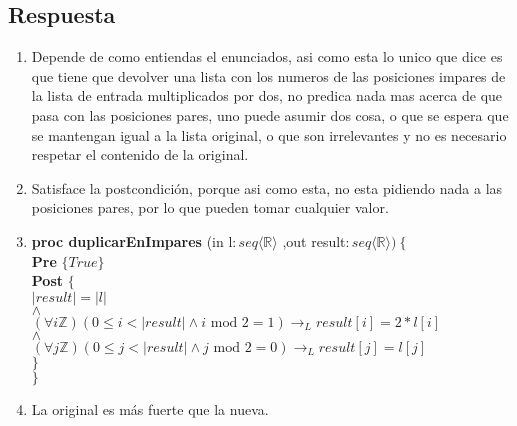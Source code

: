\documentclass[a4paper]{article}
\begin{document}
\subsection*{Respuesta}
	\begin{enumerate}[label=\alph*)]
		\item Depende de como entiendas el enunciados, asi como esta lo unico que dice es
			que tiene que devolver una lista con los numeros de las posiciones impares de la lista
			de entrada multiplicados por dos, no predica nada mas acerca de que pasa con las 
			posiciones pares, uno puede asumir dos cosa, o que se espera que se mantengan 
			igual a la lista original, o que son irrelevantes y no es necesario respetar
			el contenido de la original.
		\item
			Satisface la postcondición, porque asi como esta, no esta pidiendo nada a las
			posiciones pares, por lo que pueden tomar cualquier valor.
		\item
		
			\textbf{proc duplicarEnImpares }(in l$: seq\langle \mathbb{R}\rangle$
				,out result$:seq\langle \mathbb{R}\rangle )\ \{$\smallskip \\
			\hspace*{6mm} \textbf{Pre }$\{ True\}$\smallskip \\
			\hspace*{6mm} \textbf{Post }$\{$\\
			\hspace*{6mm} $|result|=|l|$\\
			\hspace*{6mm} $\wedge $\\
			\hspace*{6mm} $(\forall i\mathbb{Z})
					(0\leq i < |result|\wedge i\textrm{ mod }2=1)\rightarrow_L 
					result[i]=2*l[i]$\\
			\hspace*{6mm} $\wedge $\\
			\hspace*{6mm} $(\forall j\mathbb{Z})
					(0\leq j < |result|\wedge j\textrm{ mod }2=0)\rightarrow_L 
					result[j]=l[j]$\\
			\hspace*{6mm} $\}$\\
			$\}$\medskip \\
			
		\item La original es más fuerte que la nueva.
	\end{enumerate}
	
\end{document}
